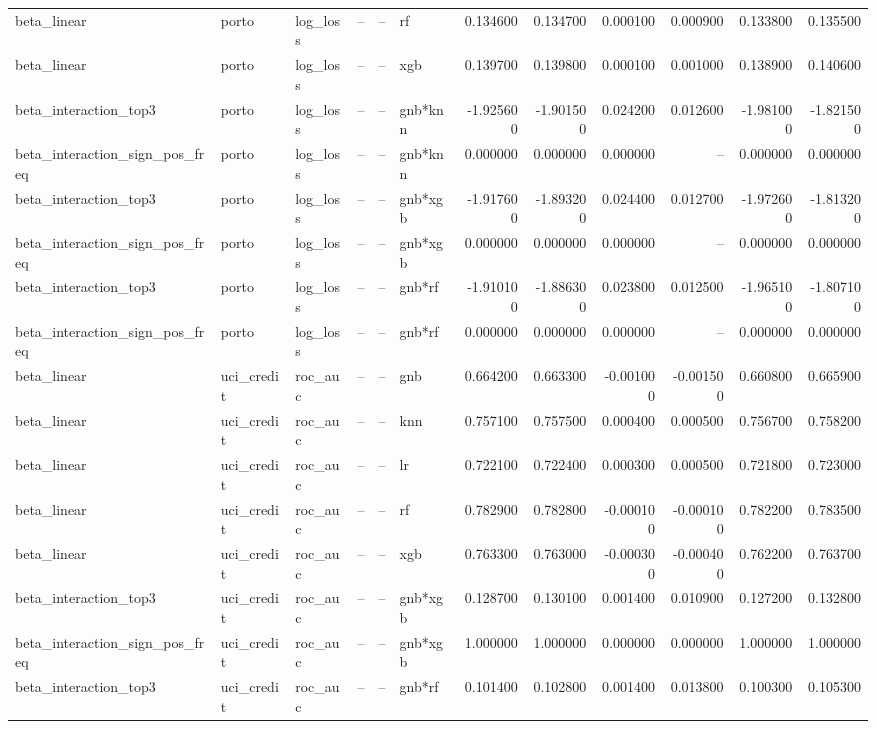 \begin{landscape}
\begin{longtable}{llllllrrrrrr}
beta\_linear & porto & log\_loss & -- & -- & rf & 0.134600 & 0.134700 & 0.000100 & 0.000900 & 0.133800 & 0.135500 \\
beta\_linear & porto & log\_loss & -- & -- & xgb & 0.139700 & 0.139800 & 0.000100 & 0.001000 & 0.138900 & 0.140600 \\
beta\_interaction\_top3 & porto & log\_loss & -- & -- & gnb*knn & -1.925600 & -1.901500 & 0.024200 & 0.012600 & -1.981000 & -1.821500 \\
beta\_interaction\_sign\_pos\_freq & porto & log\_loss & -- & -- & gnb*knn & 0.000000 & 0.000000 & 0.000000 & -- & 0.000000 & 0.000000 \\
beta\_interaction\_top3 & porto & log\_loss & -- & -- & gnb*xgb & -1.917600 & -1.893200 & 0.024400 & 0.012700 & -1.972600 & -1.813200 \\
beta\_interaction\_sign\_pos\_freq & porto & log\_loss & -- & -- & gnb*xgb & 0.000000 & 0.000000 & 0.000000 & -- & 0.000000 & 0.000000 \\
beta\_interaction\_top3 & porto & log\_loss & -- & -- & gnb*rf & -1.910100 & -1.886300 & 0.023800 & 0.012500 & -1.965100 & -1.807100 \\
beta\_interaction\_sign\_pos\_freq & porto & log\_loss & -- & -- & gnb*rf & 0.000000 & 0.000000 & 0.000000 & -- & 0.000000 & 0.000000 \\
beta\_linear & uci\_credit & roc\_auc & -- & -- & gnb & 0.664200 & 0.663300 & -0.001000 & -0.001500 & 0.660800 & 0.665900 \\
beta\_linear & uci\_credit & roc\_auc & -- & -- & knn & 0.757100 & 0.757500 & 0.000400 & 0.000500 & 0.756700 & 0.758200 \\
beta\_linear & uci\_credit & roc\_auc & -- & -- & lr & 0.722100 & 0.722400 & 0.000300 & 0.000500 & 0.721800 & 0.723000 \\
beta\_linear & uci\_credit & roc\_auc & -- & -- & rf & 0.782900 & 0.782800 & -0.000100 & -0.000100 & 0.782200 & 0.783500 \\
beta\_linear & uci\_credit & roc\_auc & -- & -- & xgb & 0.763300 & 0.763000 & -0.000300 & -0.000400 & 0.762200 & 0.763700 \\
beta\_interaction\_top3 & uci\_credit & roc\_auc & -- & -- & gnb*xgb & 0.128700 & 0.130100 & 0.001400 & 0.010900 & 0.127200 & 0.132800 \\
beta\_interaction\_sign\_pos\_freq & uci\_credit & roc\_auc & -- & -- & gnb*xgb & 1.000000 & 1.000000 & 0.000000 & 0.000000 & 1.000000 & 1.000000 \\
beta\_interaction\_top3 & uci\_credit & roc\_auc & -- & -- & gnb*rf & 0.101400 & 0.102800 & 0.001400 & 0.013800 & 0.100300 & 0.105300 \\
\end{longtable}\endgroup\addtocounter{table}{-1}

\end{landscape}
